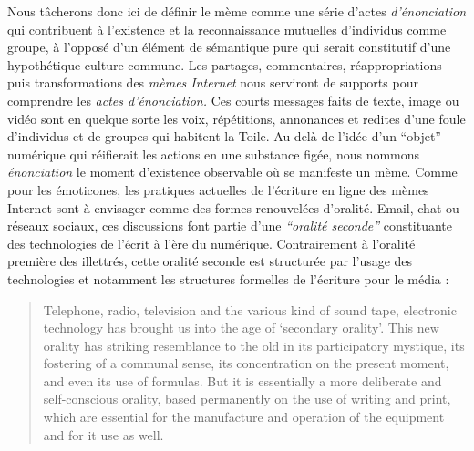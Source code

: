  
Nous t\^acherons donc ici de définir le mème comme une série d{\textquoteright}actes \textit{d{\textquoteright}énonciation }qui contribuent à l{\textquoteright}existence et la reconnaissance mutuelles d{\textquoteright}individus comme groupe, à l{\textquoteright}opposé d{\textquoteright}un élément de sémantique pure qui serait constitutif d{\textquoteright}une hypothétique culture commune. Les partages, commentaires, réappropriations puis transformations des \textit{mèmes Internet }nous serviront de supports pour comprendre les \textit{actes d{\textquoteright}énonciation. }Ces courts messages faits de texte, image ou vidéo sont en quelque sorte les voix, répétitions, annonances et redites d{\textquoteright}une foule d{\textquoteright}individus et de groupes qui habitent la Toile. Au-delà de l{\textquoteright}idée d{\textquoteright}un {\textquotedblleft}objet{\textquotedblright} numérique qui réifierait les actions en une substance figée, nous nommons \textit{énonciation} le moment d{\textquoteright}existence observable o\`u se manifeste un mème. Comme pour les émoticones, les pratiques actuelles de l{\textquoteright}écriture en ligne des mèmes Internet sont à envisager comme des formes renouvelées d{\textquoteright}oralité. Email, chat ou réseaux sociaux, ces discussions font partie d{\textquoteright}une \textit{{\textquotedblleft}oralité seconde{\textquotedblright} }\citep{Ong1988} constituante des technologies de l{\textquoteright}écrit à l{\textquoteright}ère du numérique. Contrairement à l{\textquoteright}oralité première des illettrés, cette oralité seconde est structurée par l{\textquoteright}usage des technologies et notamment les structures formelles de l{\textquoteright}écriture pour le média :  

\begin{quote}
Telephone, radio, television and the various kind of sound tape, electronic technology has brought us into the age of {\textquoteleft}secondary orality{\textquoteright}. This new orality has striking resemblance to the old in its participatory mystique, its fostering of a communal sense, its concentration on the present moment, and even its use of formulas. But it is essentially a more deliberate and self-conscious orality, based permanently on the use of writing and print, which are essential for the manufacture and operation of the equipment and for it use as well. 
\citep{Ong1988}
\end{quote}

